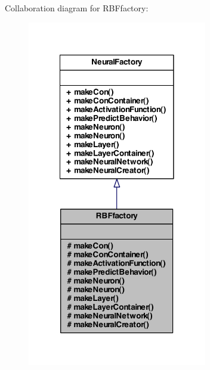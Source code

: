 Collaboration diagram for RBFfactory:
\nopagebreak
\begin{figure}[H]
\begin{center}
\leavevmode
\includegraphics[width=222pt]{class_r_b_ffactory__coll__graph}
\end{center}
\end{figure}
